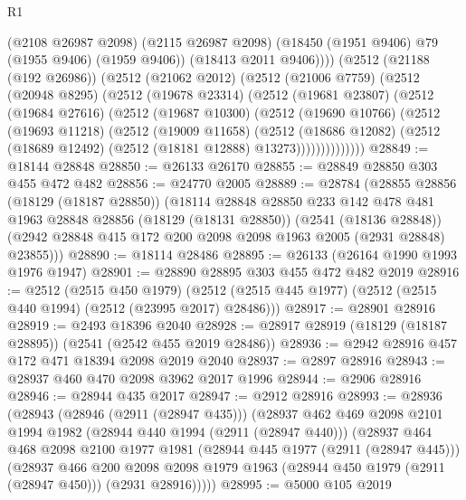 \begin{lexlean}{R1}
\begin{coremodule}
          (@2108 @26987 @2098)
          (@2115 @26987 @2098)
          (@18450 (@1951 @9406) @79 (@1955 @9406) (@1959 @9406))
          (@18413 @2011 @9406))))
    (@2512
      (@21188 (@192 @26986))
      (@2512
        (@21062 @2012)
        (@2512
          (@21006 @7759)
          (@2512
            (@20948 @8295)
            (@2512
              (@19678 @23314)
              (@2512
                (@19681 @23807)
                (@2512
                  (@19684 @27616)
                  (@2512
                    (@19687 @10300)
                    (@2512
                      (@19690 @10766)
                      (@2512
                        (@19693 @11218)
                        (@2512
                          (@19009 @11658)
                          (@2512
                            (@18686 @12082)
                            (@2512 (@18689 @12492) (@2512 (@18181 @12888) @13273))))))))))))))
@28849 := @18144 @28848
@28850 := @26133 @26170
@28855 := @28849 @28850 @303 @455 @472 @482
@28856 := @24770 @2005
@28889 := @28784
    (@28855
      @28856
      (@18129 (@18187 @28850))
      (@18114
        @28848
        @28850
        @233
        @142
        @478
        @481
        @1963
        @28848
        @28856
        (@18129 (@18131 @28850))
        (@2541 (@18136 @28848))
        (@2942 @28848 @415 @172 @200 @2098 @2098 @1963 @2005 (@2931 @28848) @23855)))
@28890 := @18114 @28486
@28895 := @26133 (@26164 @1990 @1993 @1976 @1947)
@28901 := @28890 @28895 @303 @455 @472 @482 @2019
@28916 := @2512
    (@2515 @450 @1979)
    (@2512 (@2515 @445 @1977) (@2512 (@2515 @440 @1994) (@2512 (@23995 @2017) @28486)))
@28917 := @28901 @28916
@28919 := @2493 @18396 @2040
@28928 := @28917 @28919 (@18129 (@18187 @28895)) (@2541 (@2542 @455 @2019 @28486))
@28936 := @2942 @28916 @457 @172 @471 @18394 @2098 @2019 @2040
@28937 := @2897 @28916
@28943 := @28937 @460 @470 @2098 @3962 @2017 @1996
@28944 := @2906 @28916
@28946 := @28944 @435 @2017
@28947 := @2912 @28916
@28993 := @28936
    (@28943
      (@28946 (@2911 (@28947 @435)))
      (@28937
        @462
        @469
        @2098
        @2101
        @1994
        @1982
        (@28944 @440 @1994 (@2911 (@28947 @440)))
        (@28937
          @464
          @468
          @2098
          @2100
          @1977
          @1981
          (@28944 @445 @1977 (@2911 (@28947 @445)))
          (@28937
            @466
            @200
            @2098
            @2098
            @1979
            @1963
            (@28944 @450 @1979 (@2911 (@28947 @450)))
            (@2931 @28916)))))
@28995 := @5000 @105 @2019

\end{coremodule}
\end{lexlean}

